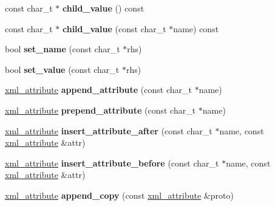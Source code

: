 \begin{DoxyCompactItemize}
const char\+\_\+t $\ast$ {\bfseries child\+\_\+value} () const
\item 
\mbox{\label{classpugi_1_1xml__node_ade95c52b1354c8d034d48e931b589d62}} 
const char\+\_\+t $\ast$ {\bfseries child\+\_\+value} (const char\+\_\+t $\ast$name) const
\item 
\mbox{\label{classpugi_1_1xml__node_a9d688489fcf0960e945a12480419e434}} 
bool {\bfseries set\+\_\+name} (const char\+\_\+t $\ast$rhs)
\item 
\mbox{\label{classpugi_1_1xml__node_a160f1fa7a0eda1e5ad9d19d45f6b0e4e}} 
bool {\bfseries set\+\_\+value} (const char\+\_\+t $\ast$rhs)
\item 
\mbox{\label{classpugi_1_1xml__node_a417eb03f034b432bb2800e54e38022aa}} 
\hyperlink{classpugi_1_1xml__attribute}{xml\+\_\+attribute} {\bfseries append\+\_\+attribute} (const char\+\_\+t $\ast$name)
\item 
\mbox{\label{classpugi_1_1xml__node_a7d70631d6cb3624cdfc4cf9ef4abad06}} 
\hyperlink{classpugi_1_1xml__attribute}{xml\+\_\+attribute} {\bfseries prepend\+\_\+attribute} (const char\+\_\+t $\ast$name)
\item 
\mbox{\label{classpugi_1_1xml__node_a74ab20fa84dffde317f8899af628f041}} 
\hyperlink{classpugi_1_1xml__attribute}{xml\+\_\+attribute} {\bfseries insert\+\_\+attribute\+\_\+after} (const char\+\_\+t $\ast$name, const \hyperlink{classpugi_1_1xml__attribute}{xml\+\_\+attribute} \&attr)
\item 
\mbox{\label{classpugi_1_1xml__node_a742898bc2342d943a4c49916ac3a64b8}} 
\hyperlink{classpugi_1_1xml__attribute}{xml\+\_\+attribute} {\bfseries insert\+\_\+attribute\+\_\+before} (const char\+\_\+t $\ast$name, const \hyperlink{classpugi_1_1xml__attribute}{xml\+\_\+attribute} \&attr)
\item 
\mbox{\label{classpugi_1_1xml__node_a4c151e6665c6bfa614fe80d177fd5396}} 
\hyperlink{classpugi_1_1xml__attribute}{xml\+\_\+attribute} {\bfseries append\+\_\+copy} (const \hyperlink{classpugi_1_1xml__attribute}{xml\+\_\+attribute} \&proto)

\end{DoxyCompactItemize}
